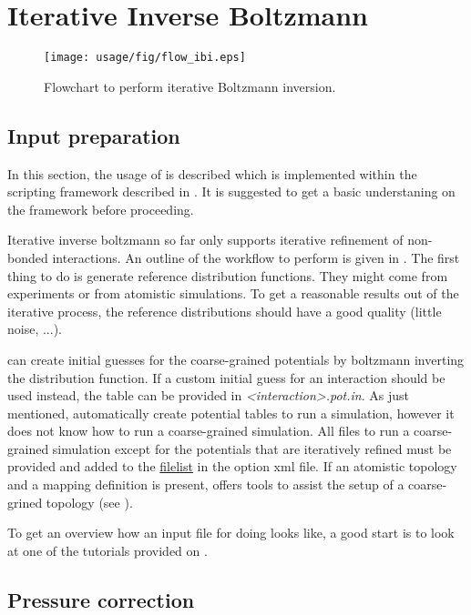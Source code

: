 \section{Iterative Inverse Boltzmann}
\begin{figure}
   \centering
   \texttt{[image: usage/fig/flow\_ibi.eps]}
   \caption{\label{fig:flow_ibi}Flowchart to perform iterative Boltzmann inversion.}
\end{figure}

\subsection{Input preparation}
In this section, the usage of \ibi is described which is implemented within the scripting framework described in . It is suggested to get a basic understaning on the framework before proceeding.

Iterative inverse boltzmann so far only supports iterative refinement of non-bonded interactions. An outline of the workflow to perform \ibi is given in . The first thing to do is generate reference distribution functions. They might come from experiments or from atomistic simulations. To get a reasonable results out of the iterative process, the reference distributions should have a good quality (little noise, ...).

\votca can create initial guesses for the coarse-grained potentials by boltzmann inverting the distribution function. If a custom initial guess for an interaction should be used instead, the table can be provided in \textit{<interaction>.pot.in}. As just mentioned, \votca automatically create potential tables to run a simulation, however it does not know how to run a coarse-grained simulation. All files to run a coarse-grained simulation except for the potentials that are iteratively refined must be provided and added to the \hyperlink{\cgref{inverse.filelist}}{filelist} in the option xml file. If an atomistic topology and a mapping definition is present, \votca offers tools to assist the setup of a  coarse-grined topology (see ).

To get an overview how an input file for doing \ibi looks like, a good start is to look at one of the tutorials provided on \votcaweb.

\subsection{Pressure correction}

